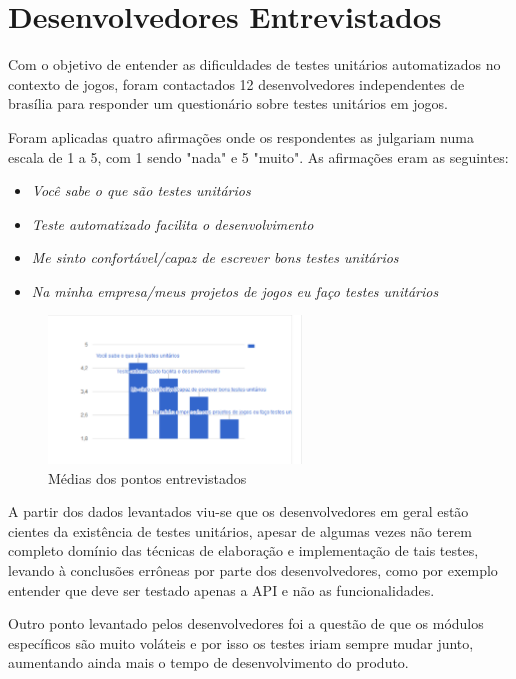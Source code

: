 \section {Desenvolvedores Entrevistados}

Com o objetivo de entender as dificuldades de testes unitários automatizados no contexto de jogos, foram contactados 12 desenvolvedores independentes de brasília para responder um questionário sobre testes unitários em jogos.

Foram aplicadas quatro afirmações onde os respondentes as julgariam numa escala de 1 a 5, com 1 sendo "nada" e 5 "muito". As afirmações eram as seguintes:
\begin{itemize}
\item \textit{Você sabe o que são testes unitários}
\item \textit{Teste automatizado facilita o desenvolvimento}
\item \textit{Me sinto confortável/capaz de escrever bons testes unitários}
\item \textit{Na minha empresa/meus projetos de jogos eu faço testes unitários}
\end{itemize}

\begin{figure}[H]
	\centering
	\includegraphics[width=0.6\textwidth]{figuras/questions.eps}
	\caption{Médias dos pontos entrevistados}
	\label{img:questions}
\end{figure}

A partir dos dados levantados viu-se que os desenvolvedores em geral estão cientes da existência de testes unitários, apesar de algumas vezes não terem completo domínio das técnicas de elaboração e implementação de tais testes, levando à conclusões errôneas por parte dos desenvolvedores, como por exemplo entender que deve ser testado apenas a API e não as funcionalidades.

Outro ponto levantado pelos desenvolvedores foi a questão de que os módulos específicos são muito voláteis e por isso os testes iriam sempre mudar junto, aumentando ainda mais o tempo de desenvolvimento do produto.

